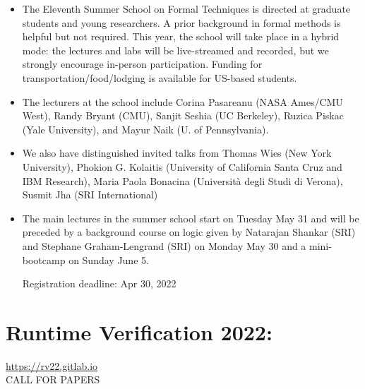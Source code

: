 \documentclass[prodmode,acmtecs]{acmsmall} %
\begin{document}
\begin{itemize}\item  The Eleventh Summer School on Formal Techniques is directed at graduate students and young researchers. A prior background in formal methods is helpful but not required. This year, the school will take place in a hybrid mode: the lectures and labs will be live-streamed and recorded, but we strongly encourage in-person participation. Funding for transportation/food/lodging is available for US-based students. 
 
\item  The lecturers at the school include Corina Pasareanu (NASA Ames/CMU West), Randy Bryant (CMU), Sanjit Seshia (UC Berkeley), Ruzica Piskac (Yale University), and Mayur Naik (U. of Pennsylvania). 
 
\item  We also have distinguished invited talks from Thomas Wies (New York University), Phokion G. Kolaitis (University of California Santa Cruz and IBM Research), Maria Paola Bonacina (Università degli Studi di Verona), Susmit Jha (SRI International) 
 
\item  The main lectures in the summer school start on Tuesday May 31 and will be preceded by a background course on logic given by Natarajan Shankar (SRI) and Stephane Graham-Lengrand (SRI) on Monday May 30 and a mini-bootcamp on Sunday June 5. 
 
Registration deadline: Apr 30, 2022 
 
\end{itemize}\section{Runtime Verification 2022:}\label{RuntimeVerification2022}  \href{https://rv22.gitlab.io}{https://rv22.gitlab.io}\\ 
CALL FOR PAPERS 
\end{document}
